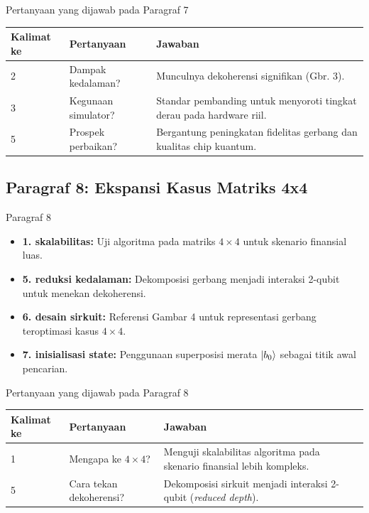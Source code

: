 \begin{frame}{Pertanyaan yang dijawab pada Paragraf 7}
    \centering
    \small
    \begin{tabular}{lp{4.5cm}p{6cm}}
        \toprule
        Kalimat ke & Pertanyaan & Jawaban \\
        \midrule
        2 & Dampak kedalaman? & Munculnya dekoherensi signifikan (Gbr. 3). \\
        3 & Kegunaan simulator? & Standar pembanding untuk menyoroti tingkat derau pada hardware riil. \\
        5 & Prospek perbaikan? & Bergantung peningkatan fidelitas gerbang dan kualitas chip kuantum. \\
        \bottomrule
    \end{tabular}
\end{frame}

\subsection{Paragraf 8: Ekspansi Kasus Matriks 4x4}
\begin{frame}{Paragraf 8}
    \begin{itemize}
        \item \textbf{1. skalabilitas:} Uji algoritma pada matriks $4 \times 4$ untuk skenario finansial luas.
        \item \textbf{5. reduksi kedalaman:} Dekomposisi gerbang menjadi interaksi 2-qubit untuk menekan dekoherensi.
        \item \textbf{6. desain sirkuit:} Referensi Gambar 4 untuk representasi gerbang teroptimasi kasus $4 \times 4$.
        \item \textbf{7. inisialisasi state:} Penggunaan superposisi merata $\ket{b_0}$ sebagai titik awal pencarian.
    \end{itemize}
\end{frame}

\begin{frame}{Pertanyaan yang dijawab pada Paragraf 8}
    \centering
    \small
    \begin{tabular}{lp{4.5cm}p{6cm}}
        \toprule
        Kalimat ke & Pertanyaan & Jawaban \\
        \midrule
        1 & Mengapa ke $4 \times 4$? & Menguji skalabilitas algoritma pada skenario finansial lebih kompleks. \\
        5 & Cara tekan dekoherensi? & Dekomposisi sirkuit menjadi interaksi 2-qubit (\textit{reduced depth}). \\
        \bottomrule
    \end{tabular}
\end{frame}


